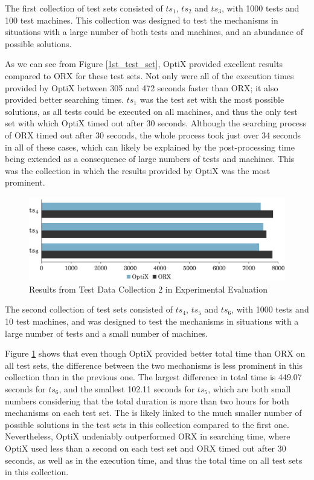 The first collection of test sets consisted of $ts_1$, $ts_2$ and $ts_3$, with 1000 tests and 100 test machines. This collection was designed to test the mechanisms in situations with a large number of both tests and machines, and an abundance of possible solutions.

As we can see from Figure \ref{1st_test_set}, OptiX provided excellent results compared to ORX for these test sets. Not only were all of the execution times provided by OptiX between 305 and 472 seconds faster than ORX; it also provided better searching times. $ts_1$ was the test set with the most possible solutions, as all tests could be executed on all machines, and thus the only test set with which OptiX timed out after 30 seconds. Although the searching process of ORX timed out after 30 seconds, the whole process took just over 34 seconds in all of these cases, which can likely be explained by the post-processing time being extended as a consequence of large numbers of tests and machines. This was the collection in which the results provided by OptiX was the most prominent.

\begin{figure}[t]
    \centering
    \includegraphics[width=\textwidth]{figures/test_results/2.pdf}
    \caption{Results from Test Data Collection 2 in Experimental Evaluation}
    \label{2nd_test_set}
\end{figure}

The second collection of test sets consisted of $ts_4$, $ts_5$ and $ts_6$, with 1000 tests and 10 test machines, and was designed to test the mechanisms in situations with a large number of tests and a small number of machines.

Figure \ref{2nd_test_set} shows that even though OptiX provided better total time than ORX on all test sets, the difference between the two mechanisms is less prominent in this collection than in the previous one. The largest difference in total time is 449.07 seconds for $ts_6$, and the smallest 102.11 seconds for $ts_5$, which are both small numbers considering that the total duration is more than two hours for both mechanisms on each test set. The  is likely linked to the much smaller number of possible solutions in the test sets in this collection compared to the first one. Nevertheless, OptiX undeniably outperformed ORX in searching time, where OptiX used less than a second on each test set and ORX timed out after 30 seconds, as well as in the execution time, and thus the total time on all test sets in this collection.

